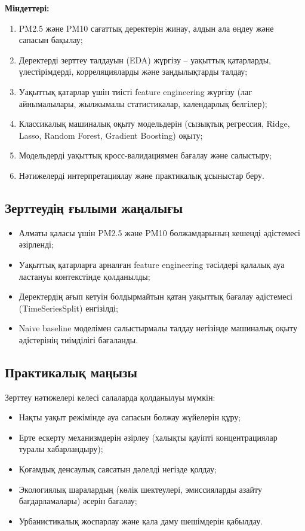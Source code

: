 \documentclass[12pt,a4paper]{article}
\begin{document}
\textbf{Міндеттері:}
\begin{enumerate}
\item PM2.5 және PM10 сағаттық деректерін жинау, алдын ала өңдеу және сапасын бақылау;
\item Деректерді зерттеу талдауын (EDA) жүргізу – уақыттық қатарларды, үлестірімдерді, корреляцияларды және заңдылықтарды талдау;
\item Уақыттық қатарлар үшін тиісті feature engineering жүргізу (лаг айнымалылары, жылжымалы статистикалар, календарлық белгілер);
\item Классикалық машиналық оқыту модельдерін (сызықтық регрессия, Ridge, Lasso, Random Forest, Gradient Boosting) оқыту;
\item Модельдерді уақыттық кросс-валидациямен бағалау және салыстыру;
\item Нәтижелерді интерпретациялау және практикалық ұсыныстар беру.
\end{enumerate}

\subsection{Зерттеудің ғылыми жаңалығы}

\begin{itemize}
\item Алматы қаласы үшін PM2.5 және PM10 болжамдарының кешенді әдістемесі әзірленді;
\item Уақыттық қатарларға арналған feature engineering тәсілдері қалалық ауа ластануы контекстінде қолданылды;
\item Деректердің ағып кетуін болдырмайтын қатаң уақыттық бағалау әдістемесі (TimeSeriesSplit) енгізілді;
\item Naive baseline моделімен салыстырмалы талдау негізінде машиналық оқыту әдістерінің тиімділігі бағаланды.
\end{itemize}

\subsection{Практикалық маңызы}

Зерттеу нәтижелері келесі салаларда қолданылуы мүмкін:
\begin{itemize}
\item Нақты уақыт режімінде ауа сапасын болжау жүйелерін құру;
\item Ерте ескерту механизмдерін әзірлеу (халықты қауіпті концентрациялар туралы хабарландыру);
\item Қоғамдық денсаулық саясатын дәлелді негізде қолдау;
\item Экологиялық шаралардың (көлік шектеулері, эмиссияларды азайту бағдарламалары) әсерін бағалау;
\item Урбанистикалық жоспарлау және қала даму шешімдерін қабылдау.
\end{itemize}
\end{document}
